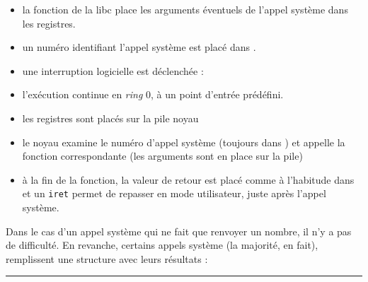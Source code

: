 \begin{itemize}
\item
  la fonction de la libc place les arguments éventuels de l'appel
  système dans les registres.
\item
  un numéro identifiant l'appel système est placé dans \eax.
\item
  une interruption logicielle est déclenchée :
\item
  l'exécution continue en \emph{ring} 0, à un point d'entrée prédéfini.
\item 
  les registres sont placés sur la pile noyau
\item
  le noyau examine le numéro d'appel système (toujours dans \eax) et appelle la
  fonction correspondante (les arguments sont en place sur la pile)
\item
  à la fin de la fonction, la valeur de retour est placé comme à l'habitude dans
  \eax et un \texttt{iret} permet de repasser en mode utilisateur, juste après
  l'appel système.
\end{itemize}


Dans le cas d'un appel système qui ne fait que renvoyer un nombre, il n'y a pas
de difficulté. En revanche, certains appels système (la majorité, en fait),
remplissent une structure avec leurs résultats :

\begin{center}\rule{3in}{0.4pt}\end{center}

